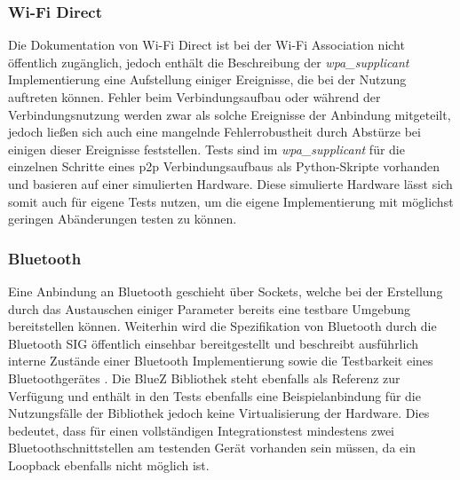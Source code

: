 		\subsubsection{Wi-Fi Direct} Die Dokumentation von Wi-Fi Direct ist bei der Wi-Fi Association nicht öffentlich zugänglich, jedoch enthält die Beschreibung der {\it wpa\_supplicant} Implementierung eine Aufstellung einiger Ereignisse, die bei der Nutzung auftreten können. Fehler beim Verbindungsaufbau oder während der Verbindungsnutzung werden zwar als solche Ereignisse der Anbindung mitgeteilt, jedoch ließen sich auch eine mangelnde Fehlerrobustheit durch Abstürze bei einigen dieser Ereignisse feststellen. Tests sind im {\it wpa\_supplicant} für die einzelnen Schritte eines p2p Verbindungsaufbaus als Python-Skripte vorhanden und basieren auf einer simulierten Hardware. Diese simulierte Hardware lässt sich somit auch für eigene Tests nutzen, um die eigene Implementierung mit möglichst geringen Abänderungen testen zu können.
		
		\subsubsection{Bluetooth} Eine Anbindung an Bluetooth geschieht über Sockets, welche bei der Erstellung durch das Austauschen einiger Parameter bereits eine testbare Umgebung bereitstellen können. Weiterhin wird die Spezifikation von Bluetooth durch die Bluetooth SIG öffentlich einsehbar bereitgestellt und beschreibt ausführlich interne Zustände einer Bluetooth Implementierung sowie die Testbarkeit eines Bluetoothgerätes \linebreak \cite{bluetoothSpec}. Die BlueZ Bibliothek steht ebenfalls als Referenz zur Verfügung und enthält in den Tests ebenfalls eine Beispielanbindung für die \linebreak Nutzungsfälle der Bibliothek jedoch keine Virtualisierung der Hardware. Dies bedeutet, dass für einen vollständigen Integrationstest mindestens zwei Bluetoothschnittstellen am testenden Gerät vorhanden sein müssen, da ein Loopback ebenfalls nicht möglich ist.
		
